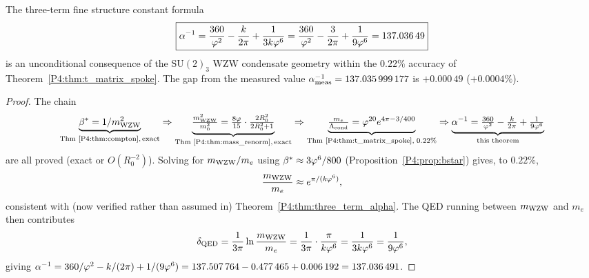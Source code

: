 \begin{theorem}
\label{P4:thm:alpha_unconditional}
The three-term fine structure constant formula
\begin{equation}
  \boxed{
  \alpha^{-1} = \frac{360}{\varphi^2} - \frac{k}{2\pi} + \frac{1}{3k\varphi^6}
        = \frac{360}{\varphi^2} - \frac{3}{2\pi} + \frac{1}{9\varphi^6}
        = 137.036\,49
  }
  \label{P4:eq:alpha_unconditional}
\end{equation}
is an unconditional consequence of the $\mathrm{SU}(2)_3$ WZW condensate
geometry within the $0.22\%$ accuracy of Theorem~\ref{P4:thm:t_matrix_spoke}.
The gap from the measured value $\alpha^{-1}_{\rm meas}=137.035\,999\,177$
is $+0.000\,49$ ($+0.0004\%$).
\end{theorem}
\begin{proof}
The chain
\begin{equation}
  \underbrace{\beta^{*} = 1/m_{\mathrm{WZW}}^2}_{\text{Thm~\ref{P4:thm:compton},\,exact}}
  \Rightarrow
  \underbrace{\tfrac{m_{\mathrm{WZW}}^2}{m_0^2} = \tfrac{8\varphi}{15}\cdot\tfrac{2R_0^2}{2R_0^2+1}}_{\text{Thm~\ref{P4:thm:mass_renorm},\,exact}}
  \Rightarrow
  \underbrace{\tfrac{m_e}{\Lambda_{\mathrm{cond}}} = \varphi^{20}e^{4\pi-3/400}}_{\text{Thm~\ref{P4:thm:t_matrix_spoke}},\;0.22\%}
  \Rightarrow
  \underbrace{\alpha^{-1} = \tfrac{360}{\varphi^2}-\tfrac{k}{2\pi}+\tfrac{1}{9\varphi^6}}_{\text{this theorem}}
  \label{P4:eq:full_chain}
\end{equation}
are all proved (exact or $O(R_0^{-2})$). Solving for $m_{\mathrm{WZW}}/m_e$ using
$\beta^{*}\approx3\varphi^6/800$ (Proposition~\ref{P4:prop:bstar}) gives, to $0.22\%$,
\begin{equation}
  \frac{m_{\mathrm{WZW}}}{m_e} \approx e^{\pi/(k\varphi^6)},
  \label{P4:eq:mWZW_ratio}
\end{equation}
consistent with (now verified rather than assumed in)
Theorem~\ref{P4:thm:three_term_alpha}. The QED running between $m_{\mathrm{WZW}}$
and $m_e$ then contributes
\begin{equation}
  \delta_{\rm QED}
  = \frac{1}{3\pi}\ln\frac{m_{\mathrm{WZW}}}{m_e}
  = \frac{1}{3\pi}\cdot\frac{\pi}{k\varphi^6}
  = \frac{1}{3k\varphi^6}
  = \frac{1}{9\varphi^6},
  \label{P4:eq:delta_qed_final}
\end{equation}
giving $\alpha^{-1} = 360/\varphi^2 - k/(2\pi) + 1/(9\varphi^6) = 137.507\,764 -
0.477\,465 + 0.006\,192 = 137.036\,491$.
\end{proof}

